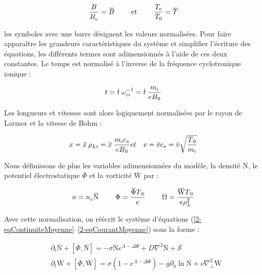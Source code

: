 \begin{refsection}
\begin{equation}
\frac{B}{B_{\indice{0}}}=\overbar{B}\text{~~~~~~~et~~~~~~~}\frac{T_e}{T_0}=\overbar{T}
\end{equation}

les symboles avec une barre désignent les valeurs normalisées. Pour faire
apparaître les grandeurs caractéristiques du système et simplifier l'écriture
des équations, les différents termes sont adimensionnés à l'aide de ces deux
constantes. Le temps est normalisé à l'inverse de la fréquence cyclotronique ionique :

\begin{equation}
t = \overbar{t}\:\omega_{ci}\puissance{-1} =
\overbar{t}\:\frac{m_i}{eB\indice{0}}
\end{equation}

Les longueurs et vitesses sont alors logiquement normalisées par le rayon de
Larmor et la vitesse de Bohm :

\begin{eqnarray}
x = \overbar{x}\:\rho_{Li} =
\overbar{x}\:\frac{m_ic_s}{eB\indice{0}} &
et &
v=\overbar{v}c_s=\overbar{v}\sqrt{\frac{T\indice{0}}{m_i}}
\end{eqnarray}

Nous définissons de plus les variables adimensionnées du modèle, la densité
$\overbar{\text{N}}$, le potentiel électrostatique $\overbar{\Phi}$ et la
vorticité $\overbar{\text{W}}$ par :

\begin{eqnarray}
n = n_{\indice{0}}\overbar{\text{N}} \text{~~~~~~~} \Phi=\frac{\overbar{\Phi}
T\indice{0}}{e}
\text{~~~~~~~} \Omega=\frac{\overbar{\text{W}} T\indice{0}}{e\rho_L^2}
\end{eqnarray}

Avec cette normalisation, on
réécrit le système d'équations
(\eqref{2-eqContinuiteMoyenne}--\eqref{2-eqCourantMoyenne}) sous la forme :

\begin{align}
\label{2-eqContinuiteNorm}
&\partial_t \overbar{\text{N}}
+\left[\overbar{\Phi},\overbar{\text{N}}\right] = -\sigma
\overline{\text{N}}e^{\Lambda-\overline{\Delta\Phi}} + D\nabla^2
\overline{\text{N}} +
\overline{\mathcal{S}}
\\
\label{2-eqCourantNorm}
&\partial_{t}\overbar{\text{W}} + 
\left[\overbar{\Phi},\overbar{\text{W}}\right] =
\sigma\left(1-e^{\Lambda-\overbar{\Delta\Phi}}\right) 
-\overbar{g}\partial_y\ln\overbar{\text{N}}
+\nu\nabla_\perp^2\overbar{\text{W}}
\end{align}


\end{refsection}
